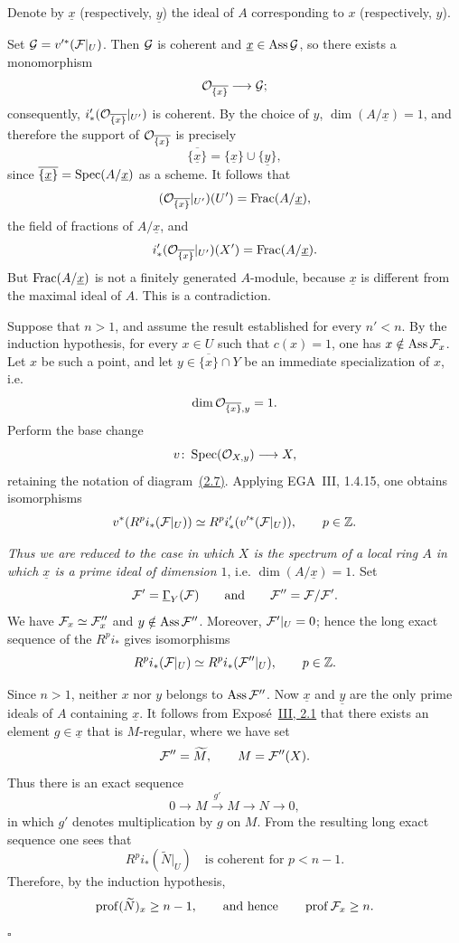 \quad Denote by
$\underline{x}$ (respectively, $\underline{y}$) the ideal of $A$
corresponding to $x$ (respectively, $y$).

\medskip
\noindent Set $\cG=v'^*(\cF|_U)$. Then $\mathcal G$ is coherent and
$\underline{x}\in\operatorname{Ass}\mathcal G$, so there exists a monomorphism
\[
  \mathcal O_{\overline{\{x\}}}\longrightarrow\mathcal G;
\]
consequently, $i'_*(\mathcal O_{\overline{\{x\}}}|_{U'})$ is coherent. By the choice
of $y$, $\dim(A/\underline{x})=1$, and therefore the support of
$\mathcal O_{\overline{\{x\}}}$ is precisely
\[
  \overline{\{\underline{x}\}}
  =\{\underline{x}\}\cup\{\underline{y}\},
\]
since $\overline{\{\underline{x}\}}=\operatorname{Spec}(A/\underline{x})$ as a scheme. It
follows that
\[
  (\mathcal O_{\overline{\{x\}}}|_{U'})(U')
  =\operatorname{Frac}(A/\underline{x}),
\]
the field of fractions of $A/\underline{x}$, and
\[
  i'_*(\mathcal O_{\overline{\{x\}}}|_{U'})(X')
  =\operatorname{Frac}(A/\underline{x}).
\]
But $\operatorname{Frac}(A/\underline{x})$ is not a finitely generated $A$-module, because
$\underline{x}$ is different from the maximal ideal of $A$. This is a
contradiction.


\medskip
\noindent Suppose that $n>1$, and assume the result established for every
$n'<n$. By the induction hypothesis, for every $x\in U$ such that $c(x)=1$,
one has $x\notin\Ass\cF_x$. Let $x$ be such a point, and let
$y\in\overline{\{x\}}\cap Y$ be an immediate specialization of $x$, i.e.
\[
  \dim\mathcal O_{\overline{\{x\}},y}=1.
\]
Perform the base change
\[
  v\colon\operatorname{Spec}(\mathcal O_{X,y})\longrightarrow X,
\]
retaining the notation of diagram~\textup{\hyperref[eq:VIII.2.7]{(2.7)}}. Applying EGA~III, 1.4.15,
one obtains isomorphisms
\[
  v^*(R^p i_*(\cF|_U))
  \simeq
  R^p i'_*(v'^*(\cF|_U)),
  \qquad p\in\mathbb Z.
\]

\noindent\emph{Thus we are reduced to the case in which $X$ is the spectrum
of a local ring $A$ in which $\underline{x}$ is a prime ideal of dimension
$1$}, i.e. $\dim(A/\underline{x})=1$. Set
\[
  \cF'=\SheafGamma_Y(\cF)
  \qquad\text{and}\qquad
  \cF''=\cF/\cF'.
\]
We have $\cF_x\simeq\cF''_x$ and $y\notin\Ass\cF''$. Moreover,
$\cF'|_U=0$; hence the long exact sequence of the $R^p i_*$ gives
isomorphisms
\[
  R^p i_*(\cF|_U)
  \simeq
  R^p i_*(\cF''|_U),
  \qquad p\in\mathbb Z.
\]

\quad Since $n>1$,
neither $x$ nor $y$ belongs to $\Ass\cF''$. Now $\underline{x}$ and
$\underline{y}$ are the only prime ideals of $A$ containing $\underline{x}$.
It follows from Expos\'e~\hyperref[III.2.1]{III, 2.1} that there exists an element
$g\in\underline{x}$ that is $M$-regular, where we have set
\[
  \cF''=\widetilde M,
  \qquad M=\cF''(X).
\]
Thus there is an exact sequence
\[
  0\longrightarrow M\xrightarrow{g'}M\longrightarrow N\longrightarrow0,
\]
in which $g'$ denotes multiplication by $g$ on $M$. From the resulting long
exact sequence one sees that
\[
  R^p i_*(\widetilde N|_U)
  \quad\text{is coherent for }p<n-1.
\]
Therefore, by the induction hypothesis,
\[
  \prof(\widetilde N)_x\geq n-1,
  \qquad\text{and hence}\qquad
  \prof\cF_x\geq n.
\]
\hfill$\square$


